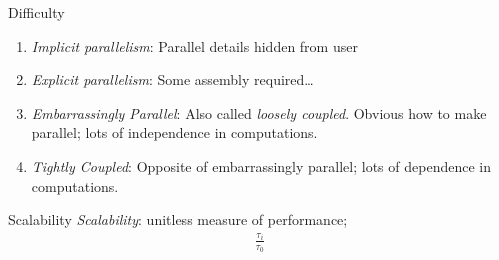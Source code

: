 

\begin{frame}
  \begin{block}{Difficulty}
  \begin{enumerate}[<+-|alert@+>]
    \item \emph{Implicit parallelism}:  Parallel details hidden from user
    \item \emph{Explicit parallelism}:  Some assembly required\dots
    \item \emph{Embarrassingly Parallel}:  Also called \emph{loosely coupled}.  Obvious how to make parallel; lots of independence in computations.
    \item \emph{Tightly Coupled}:  Opposite of embarrassingly parallel; lots of dependence in computations.
  \end{enumerate}  
  \end{block}
\end{frame}

\begin{frame}
  \begin{block}{Scalability}
   \emph{Scalability}:  unitless measure of performance;
  \begin{align*}
    \frac{\tau_i}{\tau_0}
  \end{align*}
  \end{block}
\end{frame}


